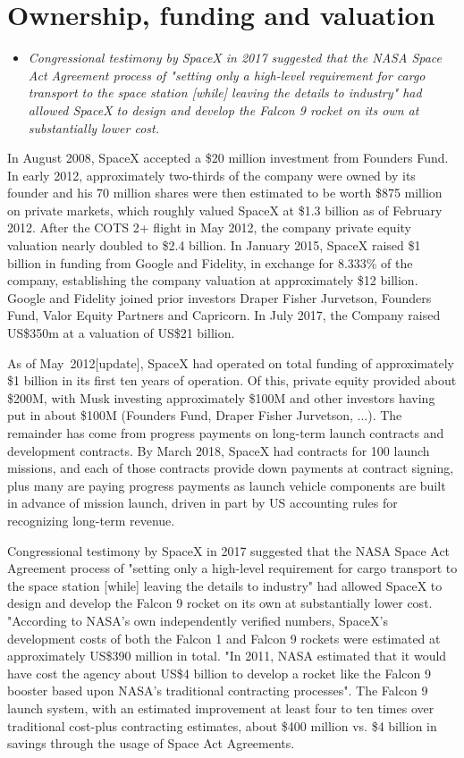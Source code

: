\section{Ownership, funding and
valuation}\label{ownership-funding-and-valuation}

\begin{itemize}
\item
  \emph{Congressional testimony by SpaceX in 2017 suggested that the
  NASA Space Act Agreement process of "setting only a high-level
  requirement for cargo transport to the space station {[}while{]}
  leaving the details to industry" had allowed SpaceX to design and
  develop the Falcon 9 rocket on its own at substantially lower cost.}
\end{itemize}

In August 2008, SpaceX accepted a \$20 million investment from Founders
Fund. In early 2012, approximately two-thirds of the company were owned
by its founder and his 70 million shares were then estimated to be worth
\$875 million on private markets, which roughly valued SpaceX at \$1.3
billion as of February 2012. After the COTS 2+ flight in May 2012, the
company private equity valuation nearly doubled to \$2.4 billion. In
January 2015, SpaceX raised \$1 billion in funding from Google and
Fidelity, in exchange for 8.333\% of the company, establishing the
company valuation at approximately \$12 billion. Google and Fidelity
joined prior investors Draper Fisher Jurvetson, Founders Fund, Valor
Equity Partners and Capricorn. In July 2017, the Company raised US\$350m
at a valuation of US\$21 billion.

As of May~2012{[}update{]}, SpaceX had operated on total funding of
approximately \$1 billion in its first ten years of operation. Of this,
private equity provided about \$200M, with Musk investing approximately
\$100M and other investors having put in about \$100M (Founders Fund,
Draper Fisher Jurvetson, ...). The remainder has come from progress
payments on long-term launch contracts and development contracts. By
March 2018, SpaceX had contracts for 100 launch missions, and each of
those contracts provide down payments at contract signing, plus many are
paying progress payments as launch vehicle components are built in
advance of mission launch, driven in part by US accounting rules for
recognizing long-term revenue.

Congressional testimony by SpaceX in 2017 suggested that the NASA Space
Act Agreement process of "setting only a high-level requirement for
cargo transport to the space station {[}while{]} leaving the details to
industry" had allowed SpaceX to design and develop the Falcon 9 rocket
on its own at substantially lower cost. "According to NASA's own
independently verified numbers, SpaceX's development costs of both the
Falcon 1 and Falcon 9 rockets were estimated at approximately US\$390
million in total. "In 2011, NASA estimated that it would have cost the
agency about US\$4 billion to develop a rocket like the Falcon 9 booster
based upon NASA's traditional contracting processes". The Falcon 9
launch system, with an estimated improvement at least four to ten times
over traditional cost-plus contracting estimates, about \$400 million
vs. \$4 billion in savings through the usage of Space Act Agreements.

